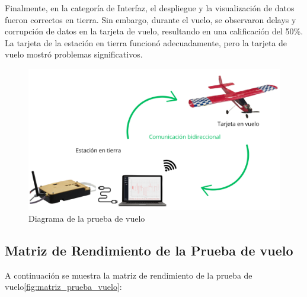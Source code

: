 Finalmente, en la categoría de Interfaz, el despliegue y la visualización de datos fueron correctos en tierra. Sin embargo, durante el vuelo, se observaron delays y corrupción de datos en la tarjeta de vuelo, resultando en una calificación del 50\%. La tarjeta de la estación en tierra funcionó adecuadamente, pero la tarjeta de vuelo mostró problemas significativos.\\
\begin{figure}[H]
    \centering
    \includegraphics[width=12  cm]{Imagenes/Pruebas/Esquematico.png}
    \caption{Diagrama de la prueba de vuelo}
    \label{fig:diagrama_prueba_vuelo}
\end{figure}


\clearpage
\subsection{Matriz de Rendimiento de la Prueba de vuelo}
A continuación se muestra la matriz de rendimiento de la prueba de vuelo\ref{fig:matriz_prueba_vuelo}:

